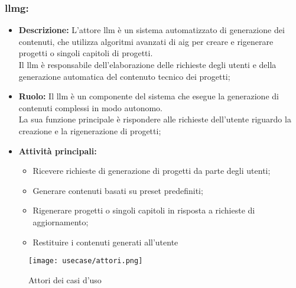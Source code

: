 \subsubsection*{\gls{llmg}:}

\begin{itemize}
    \item \textbf{Descrizione:}  L'attore \gls{llm} è un sistema automatizzato di generazione dei contenuti, che utilizza algoritmi avanzati di \gls{aig} per creare e rigenerare progetti o singoli capitoli di progetti. \\
    Il \gls{llm} è responsabile dell'elaborazione delle richieste degli utenti e della generazione automatica del contenuto tecnico dei progetti;
    \item \textbf{Ruolo:}  Il \gls{llm} è un componente del sistema che esegue la generazione di contenuti complessi in modo autonomo.\\
    La sua funzione principale è rispondere alle richieste dell'utente riguardo la creazione e la rigenerazione di progetti;
    \item \textbf{Attività principali:}
        \begin{itemize}
            \item Ricevere richieste di generazione di progetti da parte degli utenti;
            \item Generare contenuti basati su preset predefiniti;
            \item Rigenerare progetti o singoli capitoli in risposta a richieste di aggiornamento;
            \item Restituire i contenuti generati all'utente
        \end{itemize}
\end{itemize}

\begin{figure}[H]
    \centering
    \texttt{[image: usecase/attori.png]}
    \caption{Attori dei casi d'uso}
    \label{fig:attori-casi-duso}
\end{figure}


